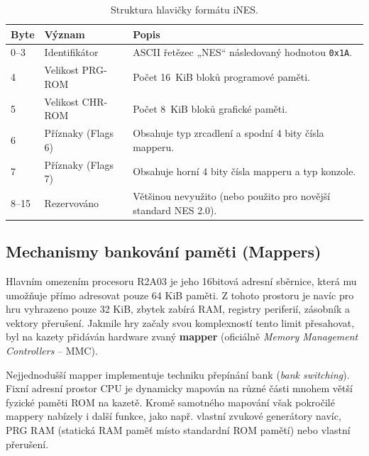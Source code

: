 \begin{table}[htbp]
    \centering
    \begin{tabular}{llp{8cm}}
        \toprule
        \textbf{Byte} & \textbf{Význam} & \textbf{Popis} \\
        \midrule
        0--3 & Identifikátor & ASCII řetězec „NES“ následovaný hodnotou \texttt{0x1A}. \\
        4 & Velikost PRG-ROM & Počet 16~KiB bloků programové paměti. \\
        5 & Velikost CHR-ROM & Počet 8~KiB bloků grafické paměti. \\
        6 & Příznaky (Flags 6) & Obsahuje typ zrcadlení a spodní 4 bity čísla mapperu. \\
        7 & Příznaky (Flags 7) & Obsahuje horní 4 bity čísla mapperu a typ konzole. \\
        8--15 & Rezervováno & Většinou nevyužito (nebo použito pro novější standard NES 2.0). \\
        \bottomrule
    \end{tabular}
    \caption{Struktura hlavičky formátu iNES.}
    \label{tab:ines_header}
\end{table}

\subsection{Mechanismy bankování paměti (Mappers)}

Hlavním omezením procesoru R2A03 je jeho 16bitová adresní sběrnice, která mu umožňuje přímo
adresovat pouze 64 KiB paměti. Z tohoto prostoru je navíc pro hru vyhrazeno pouze 32 KiB, zbytek
zabírá RAM, registry periferií, zásobník a vektory přerušení. Jakmile hry začaly svou komplexností
tento limit přesahovat, byl na kazety přidáván hardware zvaný \textbf{mapper} (oficiálně \textit{Memory
Management Controllers} -- MMC).

Nejjednodušší mapper implementuje techniku přepínání bank (\textit{bank switching}). Fixní adresní
prostor CPU je dynamicky mapován na různé části mnohem větší fyzické paměti ROM na kazetě. Kromě
samotného mapování však pokročilé mappery nabízely i další funkce, jako např. vlastní zvukové
generátory navíc, PRG RAM (statická RAM paměť místo standardní ROM pamětí) nebo vlastní přerušení.
